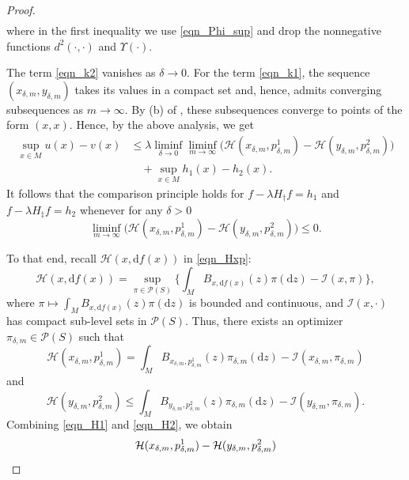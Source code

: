 \documentclass[a4paper]{article}
\newcommand{\dd}{ \mathrm{d}}
\numberwithin{equation}{section}
\theoremstyle{definition}
\begin{document}
\begin{proof}
\begin{align}
\end{align}
where in the first inequality we use \eqref{eqn_Phi_sup} and  drop the nonnegative functions  $d^2(\cdot,\cdot)$ and $\Upsilon(\cdot)$.
\par
The term \eqref{eqn_k2} vanishes as $\delta \to 0$.
For the term \eqref{eqn_k1}, the sequence $(x_{\delta,m},y_{\delta,m})$ takes its values in a compact set and, hence, admits converging subsequences as $m\to \infty$. 
By (b) of , these subsequences converge to points of the form $(x,x)$. 
Hence, by the above analysis, we get 
\begin{align*}
	\sup_{x\in M}u(x)-v(x)&\leq \lambda\liminf_{\delta\to0}\liminf_{m\to\infty} \big(\mathcal{H}(x_{\delta,m},p^1_{\delta,m})-\mathcal{H}(y_{\delta,m},p^2_{\delta,m})\big)\\
	&\quad+\sup_{x\in M}h_1(x)-h_2(x).
\end{align*}
It follows that the comparison principle holds for $f-\lambda H_\dagger f=h_1$ and $f-\lambda H_\ddagger f=h_2$ whenever for any $\delta>0$
\begin{equation}\label{eqn_H-H}
 	\liminf_{m\to\infty} \big(\mathcal{H}(x_{\delta,m},p^1_{\delta,m})-\mathcal{H}(y_{\delta,m},p^2_{\delta,m})\big)\leq0.
\end{equation}
\par
To that end, recall $\mathcal{H}(x,\mathrm{d}f(x))$ in \eqref{eqn_Hxp}:
\begin{equation*}
\mathcal{H}(x,\mathrm{d}f(x))=\sup_{\pi\in\mathcal{P}(S)}\big\{\int_M B_{x,\dd f(x)}(z)\pi(\text{d}z)-\mathcal{I}(x,\pi)\big\},
\end{equation*}
where $\pi\mapsto \int_M B_{x,\dd f(x)}(z)\pi(\mathrm{d}z)$ is bounded and continuous, and $\mathcal{I}(x,\cdot)$ has compact sub-level sets in $\mathcal{P}(S)$. Thus, there exists an optimizer $\pi_{\delta,m}\in\mathcal{P}(S)$ such that 
\begin{equation}\label{eqn_H1}
	\mathcal{H}(x_{\delta,m},p^1_{\delta,m})=\int_M B_{x_{\delta,m},p^1_{\delta,m}}(z)\pi_{\delta,m}(\text{d}z)-\mathcal{I}(x_{\delta,m},\pi_{\delta,m})
\end{equation}
and 
\begin{equation}\label{eqn_H2}
	\mathcal{H}(y_{\delta,m},p^2_{\delta,m})\leq \int_M B_{y_{\delta,m},p^2_{\delta,m}}(z)\pi_{\delta,m}(\text{d}z)-\mathcal{I}(y_{\delta,m},\pi_{\delta,m}).
\end{equation}
Combining \eqref{eqn_H1} and \eqref{eqn_H2}, we obtain 
\begin{align}
	\mathcal{H}&(x_{\delta,m},p^1_{\delta,m})-\mathcal{H}(y_{\delta,m},p^2_{\delta,m})\notag\\

\end{align}
\end{proof}
\end{document}
